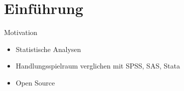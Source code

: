 \documentclass[xcolor=dvipsnames, aspectratio = 169]{beamer}
\begin{document}
\section{Einführung}
\begin{frame}[fragile]{Motivation}
  \begin{itemize}
  \item Statistische Analysen
  \item Handlungsspielraum verglichen mit SPSS, SAS, Stata
  \item Open Source
  \end{itemize}
\end{frame}
\end{document}
